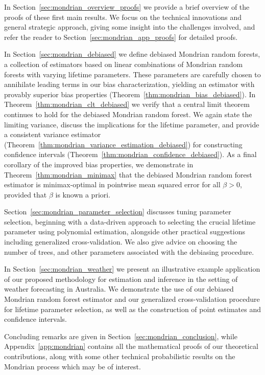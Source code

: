 \documentclass[11pt,lof]{puthesis}
\theoremstyle{break}
\theoremstyle{proof}
\begin{document}
In Section~\ref{sec:mondrian_overview_proofs} we provide a brief overview of
the proofs
of these first main results. We focus on the technical innovations and general
strategic approach, giving some insight into the challenges involved, and refer
the reader to Section~\ref{sec:mondrian_app_proofs} for detailed proofs.

In Section~\ref{sec:mondrian_debiased} we define debiased Mondrian random
forests, a
collection of estimators based on linear combinations of Mondrian random
forests with varying lifetime parameters. These parameters are carefully chosen
to annihilate leading terms in our bias characterization, yielding an estimator
with provably superior bias properties
(Theorem~\ref{thm:mondrian_bias_debiased}). In
Theorem~\ref{thm:mondrian_clt_debiased}
we verify that a central limit theorem continues to hold for the debiased
Mondrian random forest. We again state the limiting variance, discuss the
implications for the lifetime parameter, and provide a consistent variance
estimator (Theorem~\ref{thm:mondrian_variance_estimation_debiased}) for
constructing confidence intervals
(Theorem~\ref{thm:mondrian_confidence_debiased}). As a final corollary of the
improved bias properties, we demonstrate in Theorem~\ref{thm:mondrian_minimax}
that the debiased Mondrian random forest estimator is minimax-optimal in
pointwise mean squared error for all $\beta > 0$, provided that $\beta$ is known
a priori.

Section~\ref{sec:mondrian_parameter_selection} discusses tuning parameter
selection,
beginning with a data-driven approach to selecting the crucial lifetime
parameter using polynomial estimation, alongside other practical suggestions
including generalized cross-validation.
We also give advice on choosing the number of trees, and other parameters
associated with the debiasing procedure.

In Section~\ref{sec:mondrian_weather} we present an illustrative example
application of our proposed methodology for estimation and inference in the
setting of weather forecasting in Australia. We demonstrate the use of
our debiased Mondrian random forest estimator and our
generalized cross-validation procedure for lifetime parameter selection,
as well as the construction of point estimates and confidence intervals.

Concluding remarks are given in Section~\ref{sec:mondrian_conclusion}, while
Appendix~\ref{app:mondrian} contains all the mathematical proofs of our
theoretical contributions, along with some other technical
probabilistic results on the Mondrian process which may be of interest.
\end{document}
